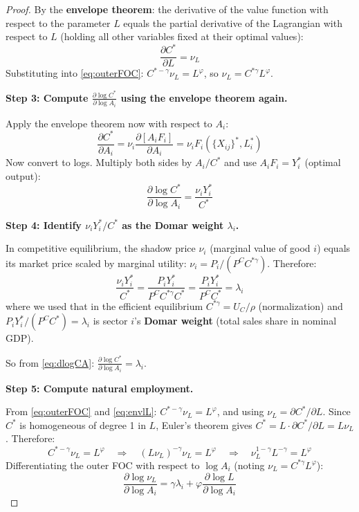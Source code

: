 \documentclass[12pt]{article}
\begin{document}
\begin{proof}
By the \textbf{envelope theorem}: the derivative of the value function with respect to the parameter $L$ equals the partial derivative of the Lagrangian with respect to $L$ (holding all other variables fixed at their optimal values):
\begin{equation}
    \frac{\partial C^*}{\partial L} = \nu_L
    \label{eq:envlL}
\end{equation}
Substituting into \eqref{eq:outerFOC}: $C^{*-\gamma} \nu_L = L^\varphi$, so $\nu_L = C^{*\gamma} L^\varphi$.

\medskip
\textbf{Step 3: Compute $\frac{\partial \log C^*}{\partial \log A_i}$ using the envelope theorem again.}

Apply the envelope theorem now with respect to $A_i$:
\begin{equation}
    \frac{\partial C^*}{\partial A_i} = \nu_i \frac{\partial [A_i F_i]}{\partial A_i} = \nu_i F_i(\{X_{ij}\}^*, L_i^*)
    \label{eq:envlA}
\end{equation}
Now convert to logs. Multiply both sides by $A_i/C^*$ and use $A_i F_i = Y_i^*$ (optimal output):
\begin{equation}
    \frac{\partial \log C^*}{\partial \log A_i} = \frac{\nu_i Y_i^*}{C^*}
    \label{eq:dlogCA}
\end{equation}

\medskip
\textbf{Step 4: Identify $\nu_i Y_i^* / C^*$ as the Domar weight $\lambda_i$.}

In competitive equilibrium, the shadow price $\nu_i$ (marginal value of good $i$) equals its market price scaled by marginal utility: $\nu_i = P_i / (P^C C^{*\gamma})$. Therefore:
\begin{equation}
    \frac{\nu_i Y_i^*}{C^*} = \frac{P_i Y_i^*}{P^C C^{*\gamma} C^*} = \frac{P_i Y_i^*}{P^C C^*} = \lambda_i
\end{equation}
where we used that in the efficient equilibrium $C^{*\gamma} = U_C / \rho$ (normalization) and $P_i Y_i^* / (P^C C^*) = \lambda_i$ is sector $i$'s \textbf{Domar weight} (total sales share in nominal GDP).

So from \eqref{eq:dlogCA}: $\frac{\partial \log C^*}{\partial \log A_i} = \lambda_i$.

\medskip
\textbf{Step 5: Compute natural employment.}

From \eqref{eq:outerFOC} and \eqref{eq:envlL}: $C^{*-\gamma} \nu_L = L^\varphi$, and using $\nu_L = \partial C^*/\partial L$. Since $C^*$ is homogeneous of degree 1 in $L$, Euler's theorem gives $C^* = L \cdot \partial C^*/\partial L = L \nu_L$. Therefore:
\begin{equation}
    C^{*-\gamma} \nu_L = L^\varphi \quad \Rightarrow \quad (L\nu_L)^{-\gamma}\nu_L = L^\varphi \quad \Rightarrow \quad \nu_L^{1-\gamma} L^{-\gamma} = L^\varphi
\end{equation}
Differentiating the outer FOC with respect to $\log A_i$ (noting $\nu_L = C^{*\gamma}L^\varphi$):
\begin{equation}
    \frac{\partial \log \nu_L}{\partial \log A_i} = \gamma\lambda_i + \varphi \frac{\partial \log L}{\partial \log A_i}
    \label{eq:dlognu}
\end{equation}


\end{proof}
\end{document}

